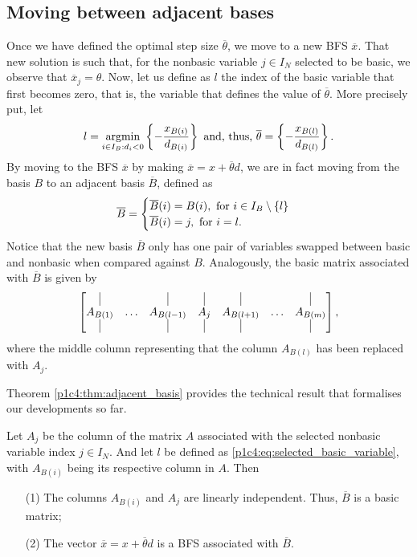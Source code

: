 \subsection{Moving between adjacent bases}

Once we have defined the optimal step size $\overline{\theta}$, we move to a new BFS $\overline{x}$. That new solution is such that, for the nonbasic variable $j \in I_N$ selected to be basic, we observe that $\overline{x}_j = \theta$. Now, let us define as $l$ the index of the basic variable that first becomes zero, that is, the variable that defines the value of $\overline{\theta}$. More precisely put, let 
%
\begin{equation}
	l = \mathop{\rm argmin}_{i \in I_B : d_i <0}	\left\{ -\frac{x_{B(i)}}{d_{B(i)}} \right \} \text{ and, thus, } \overline{\theta} = \left\{ -\frac{x_{B(l)}}{d_{B(l)}} \right \}. \label{p1c4:eq:selected_basic_variable}	
\end{equation}
%
By moving to the BFS $\overline{x}$ by making $\overline{x} = x + \overline{\theta}d$, we are in fact moving from the basis $B$ to an adjacent basis $\overline{B}$, defined as
%
\begin{equation*}
	\overline{B} = 
		\begin{cases} 
			\overline{B}(i) = B(i), \text{ for }i \in I_B \setminus \left\{ l \right \} \\
			\overline{B}(i) = j, \text{ for } i = l. 
		\end{cases}
\end{equation*}
%
Notice that the new basis $\overline{B}$ only has one pair of variables swapped between basic and nonbasic when compared against $B$. Analogously, the basic matrix associated with $\overline{B}$ is given by 
%
\begin{equation*}
	\begin{bmatrix}
		\vline   &  & \vline & \vline & \vline &  & \vline \\
		A_{B(1)} & \dots & A_{B(l-1)} & A_j &  A_{B(l+1)} & \dots & A_{B(m)} \\
		\vline   &  & \vline & \vline & \vline &  & \vline 
	\end{bmatrix},	
\end{equation*}
%
where the middle column representing that the column $A_{B(l)}$ has been replaced with $A_j$. 

Theorem \ref{p1c4:thm:adjacent_basis} provides the technical result that formalises our developments so far.

\begin{theorem} \label{p1c4:thm:adjacent_basis}
	Let $A_j$ be the column of the matrix $A$ associated with the selected nonbasic variable index $j \in I_N$. And let $l$ be defined as \eqref{p1c4:eq:selected_basic_variable}, with $A_{B(i)}$ being its respective column in $A$. Then	 
	\begin{enumerate}
		\item[(1)] The columns $A_{B(i)}$ and $A_j$ are linearly independent. Thus, $\overline{B}$ is a basic matrix;
		\item[(2)] The vector $\overline{x} = x + \overline{\theta}d$ is a BFS associated with $\overline{B}$.
	\end{enumerate}
\end{theorem}

